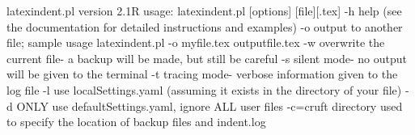 latexindent.pl version 2.1R
usage: latexindent.pl [options] [file][.tex]
-h  help (see the documentation for detailed instructions and examples)
-o  output to another file; sample usage
latexindent.pl -o myfile.tex outputfile.tex
-w  overwrite the current file- a backup will be made, but still be careful
-s  silent mode- no output will be given to the terminal
-t  tracing mode- verbose information given to the log file
-l  use localSettings.yaml (assuming it exists in the directory of your file)
-d  ONLY use defaultSettings.yaml, ignore ALL user files
-c=cruft directory used to specify the location of backup files and indent.log
